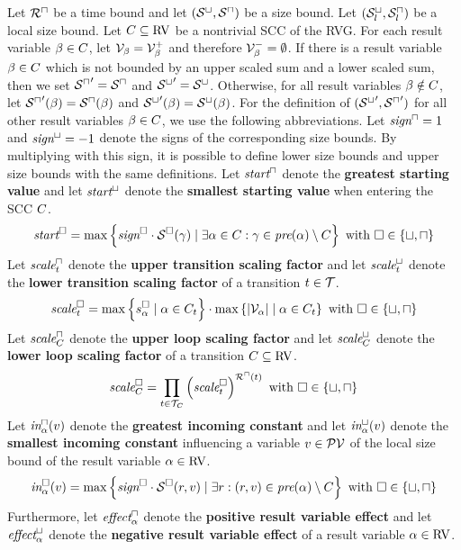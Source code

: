 \begin{theorem}
  Let ${\mathcal{R}^\sqcap}$ be a time bound and let ${({\mathcal{S}^\sqcup}, {\mathcal{S}^\sqcap})}$ be a size bound.
  Let ${({\mathcal{S}^\sqcup_l}, {\mathcal{S}^\sqcap_l})}$ be a local size bound.
  Let $C \subseteq \text{RV}$ be a nontrivial SCC of the RVG.
  For each result variable $\beta \in C$, let $\mathcal{V}_\beta = \mathcal{V}^+_\beta$ and therefore $\mathcal{V}^-_\beta = \emptyset$.
  If there is a result variable $\beta \in C$ which is not bounded by an upper scaled sum and a lower scaled sum, then we set ${\mathcal{S}^\sqcap}' = {\mathcal{S}^\sqcap}$ and ${\mathcal{S}^\sqcup}' = {\mathcal{S}^\sqcup}$.
  Otherwise, for all result variables $\beta \notin C$, let ${\mathcal{S}^\sqcap}'(\beta) = {\mathcal{S}^\sqcap}(\beta)$ and ${\mathcal{S}^\sqcup}'(\beta) = {\mathcal{S}^\sqcup}(\beta)$.
  For the definition of $({\mathcal{S}^\sqcup}', {\mathcal{S}^\sqcap}')$ for all other result variables $\beta \in C$, we use the following abbreviations.
  Let $\emph{sign}^\sqcap = 1$ and $\emph{sign}^\sqcup = -1$ denote the signs of the corresponding size bounds.
  By multiplying with this sign, it is possible to define lower size bounds and upper size bounds with the same definitions.
  Let $\emph{start}^\sqcap$ denote the \textbf{greatest starting value} and let $\emph{start}^\sqcup$ denote the \textbf{smallest starting value} when entering the SCC $C$.
  \[ \emph{start}^\square = \max \left\lbrace \emph{sign}^\square \cdot {\mathcal{S}^\square}(\gamma) \mid \exists \alpha \in C: \gamma \in \emph{pre}(\alpha) \setminus C \right\rbrace \text{ with } \square \in \lbrace \sqcup, \sqcap \rbrace \]
  Let $\emph{scale}^\sqcap_t$ denote the \textbf{upper transition scaling factor} and let $\emph{scale}^\sqcup_t$ denote the \textbf{lower transition scaling factor} of a transition $t \in \mathcal{T}$.
  \[ \emph{scale}^\square_t = \max \left\lbrace s^\square_\alpha \mid \alpha \in C_t \right\rbrace \cdot \max \left\lbrace \left|\mathcal{V}_\alpha\right| \mid \alpha \in C_t \right\rbrace \text{ with } \square \in \lbrace \sqcup, \sqcap \rbrace \]
  Let $\emph{scale}^\sqcap_C$ denote the \textbf{upper loop scaling factor} and let $\emph{scale}^\sqcup_C$ denote the \textbf{lower loop scaling factor} of a transition $C \subseteq \text{RV}$.
  \[ \emph{scale}^\square_C = \prod_{t \in \mathcal{T}_C} \left( \emph{scale}^\square_t \right) ^{{\mathcal{R}^\sqcap}(t)} \text{ with } \square \in \lbrace \sqcup, \sqcap \rbrace \]
  Let $\emph{in}^\sqcap_\alpha(v)$ denote the \textbf{greatest incoming constant} and let $\emph{in}^\sqcup_\alpha(v)$ denote the \textbf{smallest incoming constant} influencing a variable $v \in \mathcal{PV}$ of the local size bound of the result variable $\alpha \in \text{RV}$.
  \[ \emph{in}^\square_\alpha(v) = \max \left\lbrace \emph{sign}^\square \cdot {\mathcal{S}^\square}(r, v) \mid \exists r: (r, v) \in \emph{pre}(\alpha) \setminus C \right\rbrace \text{ with } \square \in \lbrace \sqcup, \sqcap \rbrace \]
  Furthermore, let $\emph{effect}^\sqcap_\alpha$ denote the \textbf{positive result variable effect} and let $\emph{effect}^\sqcup_\alpha$ denote the \textbf{negative result variable effect} of a result variable $\alpha \in \text{RV}$.

\end{theorem}
